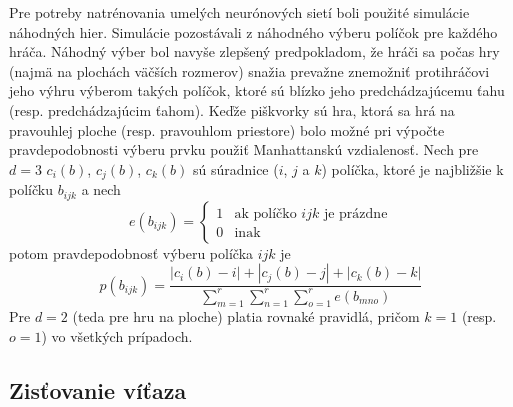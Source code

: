 Pre potreby natrénovania umelých neurónových sietí boli použité simulácie náhodných hier.
Simulácie pozostávali z náhodného výberu políčok pre každého hráča.
Náhodný výber bol navyše zlepšený predpokladom, že hráči sa počas hry (najmä na plochách väčších rozmerov) snažia
prevažne znemožniť protihráčovi jeho výhru výberom takých políčok, ktoré sú blízko jeho predchádzajúcemu ťahu
(resp. predchádzajúcim ťahom).
Keďže piškvorky sú hra, ktorá sa hrá na pravouhlej ploche (resp. pravouhlom priestore) bolo možné pri výpočte
pravdepodobnosti výberu prvku použiť Manhattanskú vzdialenosť.
Nech pre $d=3$ $c_i(b)$, $c_j(b)$, $c_k(b)$ sú súradnice ($i$, $j$ a $k$) políčka, ktoré je najbližšie k políčku
$b_{ijk}$ a nech
\begin{equation}
    e(b_{ijk}) =
    \begin{cases}
        1 & \text{ak políčko }ijk\text{ je prázdne} \\
        0 & \text{inak}
    \end{cases}
\end{equation}
potom pravdepodobnosť výberu políčka $ijk$ je
\begin{equation}
    p(b_{ijk}) = \frac{|c_i(b) - i| + |c_j(b) - j| + |c_k(b) - k|}{\sum_{m=1}^r\sum_{n=1}^r\sum_{o=1}^r e(b_{mno})}
\end{equation}
Pre $d=2$ (teda pre hru na ploche) platia rovnaké pravidlá, pričom $k=1$ (resp. $o=1$) vo všetkých prípadoch.

\subsection{Zisťovanie víťaza}\label{subsec:checking-winner}

